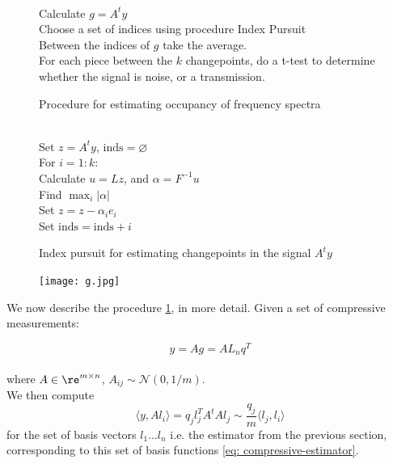 \begin{figure}
\begin{algorithmic}[1]
 \\
Calculate \(g=A^ty\)
 \\
Choose a set of indices using procedure Index Pursuit
\\
 Between the indices of \(g\) take the average.
 \\
   	For each piece between the \(k\) changepoints, do a t-test to determine whether the signal is noise, or a transmission.
   	\EndProcedure
\end{algorithmic}
 \caption{Procedure for estimating occupancy of frequency spectra}
 \label{alg:single-slot}
\end{figure}

\begin{figure}
\begin{algorithmic}[1]
 \\
 Set \(z = A^ty\), \(\mathrm{inds} = \varnothing \)
 \\ For \(i=1:k\):
 \\ Calculate \(u = Lz\), and \(\alpha = F^{-1}u\)
 \\ Find \(\max_i|\alpha|\)
 \\ Set \(z = z - \alpha_i e_i\)
 \\ Set \(\mathrm{inds} = \mathrm{inds}+i\)
 \EndProcedure
\end{algorithmic}
 \caption{Index pursuit for estimating changepoints in the signal \(A^ty\)}
 \label{alg:index_pursuit}
\end{figure}

\begin{figure}[h]
\centering
\texttt{[image: g.jpg]}
\caption{}
\label{fig:rectangle}
\end{figure}

We now describe the procedure \ref{alg:single-slot}, in more detail. Given a set of compressive measurements: 

\begin{equation}
y = Ag = AL_n q^T
\end{equation}
\\
where \(A \in \re^{m \times n} \), \(A_{ij} \sim \mathcal{N}\left(0,1/m\right)\).
\\
We then compute 
\begin{equation}
\langle y, Al_i\rangle = q_j  l_j^TA^tAl_j \sim \frac{q_j}{m} \langle l_j, l_i \rangle
\label{key-step}
\end{equation}
for the set of basis vectors \(l_1 \ldots l_n\) i.e. the estimator from the previous section, corresponding to this set of basis functions \eqref{eq: compressive-estimator}. 

